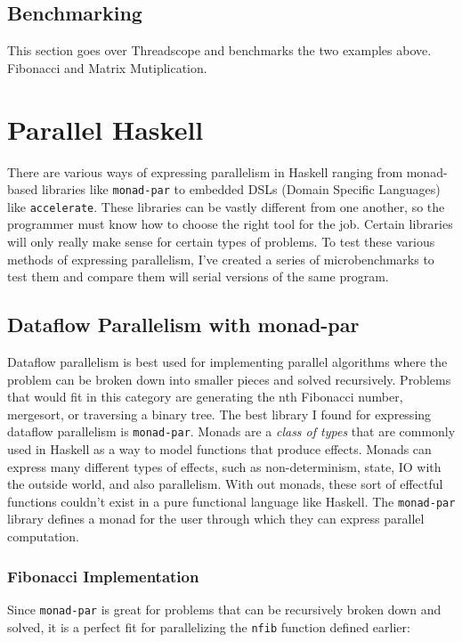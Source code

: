 \documentclass[a4paper, 10pt]{article}
\begin{document}
\subsection{Benchmarking}
This section goes over Threadscope and benchmarks the two examples above. Fibonacci and Matrix Mutiplication.

\section{Parallel Haskell}

There are various ways of expressing parallelism in Haskell ranging from monad-based libraries like \lstinline{monad-par} to embedded DSLs (Domain Specific Languages) like \lstinline{accelerate}. These libraries can be vastly different from one another, so the programmer must know how to choose the right tool for the job. Certain libraries will only really make sense for certain types of problems. To test these various methods of expressing parallelism, I've created a series of microbenchmarks to test them and compare them will serial versions of the same program.

\subsection{Dataflow Parallelism with monad-par}

Dataflow parallelism is best used for implementing parallel algorithms where the problem can be broken down into smaller pieces and solved recursively. Problems that would fit in this category are generating the nth Fibonacci number, mergesort, or traversing a binary tree. The best library I found for expressing dataflow parallelism is \lstinline{monad-par}. Monads are a \textit{class of types} that are commonly used in Haskell as a way to model functions that produce effects. Monads can express many different types of effects, such as non-determinism, state, IO with the outside world, and also parallelism. With out monads, these sort of effectful functions couldn't exist in a pure functional language like Haskell. The \lstinline{monad-par} library defines a monad for the user through which they can express parallel computation.

\subsubsection{Fibonacci Implementation}

Since \lstinline{monad-par} is great for problems that can be recursively broken down and solved, it is  a perfect fit for parallelizing the \lstinline{nfib} function defined earlier:
\end{document}
